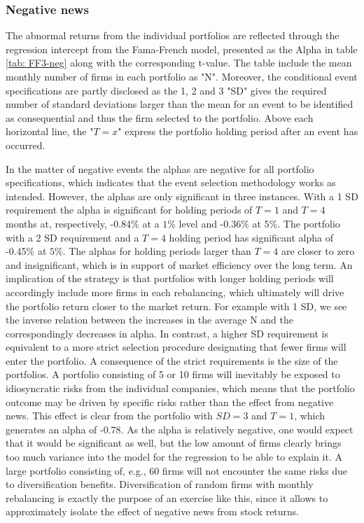 \subsubsection{Negative news}

The abnormal returns from the individual portfolios are reflected through the regression intercept from the Fama-French model, presented as the Alpha in table \ref{tab: FF3-neg} along with the corresponding t-value. The table include the mean monthly number of firms in each portfolio as "N". Moreover, the conditional event specifications are partly disclosed as the 1, 2 and 3 "SD" gives the required number of standard deviations larger than the mean for an event to be identified as consequential and thus the firm selected to the portfolio. Above each horizontal line, the "$T = x$" express the portfolio holding period after an event has occurred. 

In the matter of negative events the alphas are negative for all portfolio specifications, which indicates that the event selection methodology works as intended. However, the alphas are only significant in three instances. With a 1 SD requirement the alpha is significant for holding periods of $T = 1$ and $T = 4$ months at, respectively, -0.84\% at a $1\%$ level and -0.36\% at $5\%$. The portfolio with a 2 SD requirement and a $T=4$ holding period has significant alpha of -0.45\% at $5\%$. The alphas for holding periods larger than $T = 4$ are closer to zero and insignificant, which is in support of market efficiency over the long term. An implication of the strategy is that portfolios with longer holding periods will accordingly include more firms in each rebalancing, which ultimately will drive the portfolio return closer to the market return. For example with 1 SD, we see the inverse relation between the increases in the average N and the correspondingly decreases in alpha. In contrast, a higher SD requirement is equivalent to a more strict selection procedure designating that fewer firms will enter the portfolio. A consequence of the strict requirements is the size of the portfolios. A portfolio consisting of 5 or 10 firms will inevitably be exposed to idiosyncratic risks from the individual companies, which means that the portfolio outcome may be driven by specific risks rather than the effect from negative news. This effect is clear from the portfolio with $SD = 3$ and $T=1$, which generates an alpha of -0.78. As the alpha is relatively negative, one would expect that it would be significant as well, but the low amount of firms clearly brings too much variance into the model for the regression to be able to explain it. A large portfolio consisting of, e.g., 60 firms will not encounter the same risks due to diversification benefits. Diversification of random firms with monthly rebalancing is exactly the purpose of an exercise like this, since it allows to approximately isolate the effect of negative news from stock returns. 

